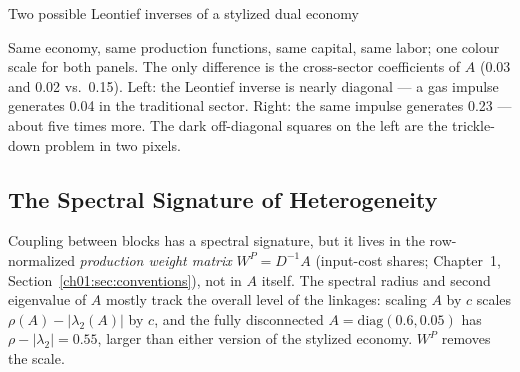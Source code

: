 \documentclass[../structural_economics_book.tex]{subfiles}
\begin{document}
\begin{vizpanel}{Two possible Leontief inverses of a stylized dual economy}
\begin{center}
\end{center}
\vspace{-0.5em}
\small Same economy, same production functions, same capital, same labor; one colour scale for both panels. The only difference is the cross-sector coefficients of $A$ (0.03 and 0.02 vs.\ 0.15). Left: the Leontief inverse is nearly diagonal --- a gas impulse generates 0.04 in the traditional sector. Right: the same impulse generates 0.23 --- about five times more. The dark off-diagonal squares on the left are the trickle-down problem in two pixels.
\end{vizpanel}


\subsection{The Spectral Signature of Heterogeneity}

Coupling between blocks has a spectral signature, but it lives in the row-normalized \textit{production weight matrix} $W^P = D^{-1}A$ (input-cost shares; Chapter~1, Section~\ref{ch01:sec:conventions}), not in $A$ itself. The spectral radius and second eigenvalue of $A$ mostly track the overall level of the linkages: scaling $A$ by $c$ scales $\rho(A) - |\lambda_2(A)|$ by $c$, and the fully disconnected $A = \text{diag}(0.6, 0.05)$ has $\rho - |\lambda_2| = 0.55$, larger than either version of the stylized economy. $W^P$ removes the scale.
\end{document}
